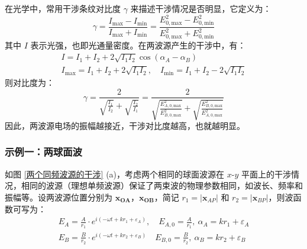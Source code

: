 \documentclass[UTF8]{report}
\theoremstyle{MyLineTheoremStyle} %
\theoremstyle{MyBlockTheoremStyle} %
\theoremstyle{MySubsubsectionStyle} %
\begin{document}
在光学中，常用干涉条纹对比度 $\gamma$ 来描述干涉情况是否明显，它定义为：
\begin{equation}
    \gamma = \frac{I_{\text{max}} - I_{\text{min}}}{I_{\text{max}} + I_{\text{min}}} = \frac{ E_{0,\text{max}}^2 -  E_{0,\text{min}}^2 }{E_{0,\text{max}}^2 +  E_{0,\text{min}}^2}
\end{equation}
其中 $I$ 表示光强，也即光通量密度。在两波源产生的干涉中，有：
\begin{gather}
I = I_1 + I_2 + 2 \sqrt{I_1I_2}\cos (\alpha_A - \alpha_B) \\ 
I_{\text{max}} = I_1 + I_2 + 2\sqrt{I_1I_2},\quad I_{\text{min}} =  I_1 + I_2 - 2\sqrt{I_1I_2}
\end{gather}
则对比度为：
\begin{equation}
\gamma = \frac{2  }{ \sqrt{\frac{I_1}{I_2}}  + \sqrt{\frac{I_2}{I_1}}} = \frac{ 2  }{  \sqrt{\frac{E_{A,0,\text{max}}^2}{E_{B,0,\text{max}}^2}} + \sqrt{\frac{E_{B,0,\text{max}}^2}{E_{A,0,\text{max}}^2}}}
\end{equation}
因此，两波源电场的振幅越接近，干涉对比度越高，也就越明显。

\subsubsection{示例一：两球面波}

如图 \ref{两个同频波源的干涉} (a)，考虑两个相同的球面波源在 $x$-$y$ 平面上的干涉情况，相同的波源（理想单频波源）保证了两束波的物理参数相同，如波长、频率和振幅等。设两波源位置分别为 $\boldsymbol{x_{OA}}$，$\boldsymbol{x_{OB}}$，简记 $ r_1 = | \boldsymbol{x}_{AP} |$ 和 $ r_2 = | \boldsymbol{x}_{BP} |$，则波函数可写为：
\begin{gather}
E_A = \frac{A}{r_1 } \cdot e^{i(-\omega t + k r_1 + \varepsilon_A)},\quad E_{A,0} = \frac{A}{r_1 },\ \alpha_A = k r_1 + \varepsilon_A
\\
E_B = \frac{B}{ r_2 } \cdot e^{i(-\omega t + k r_2  + \varepsilon_B)}\quad E_{B,0} = \frac{B}{ r_2 },\ \alpha_B = k r_2  + \varepsilon_B
\end{gather}
\end{document}
